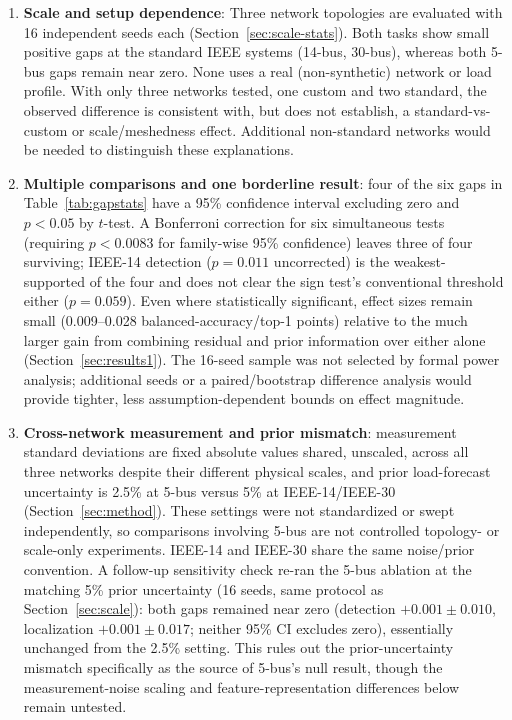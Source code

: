 \documentclass[conference]{IEEEtran}
\begin{document}
\begin{enumerate}
\item \textbf{Scale and setup dependence}: Three network topologies are evaluated with 16 independent seeds each (Section~\ref{sec:scale-stats}). Both tasks show small positive gaps at the standard IEEE systems (14-bus, 30-bus), whereas both 5-bus gaps remain near zero. None uses a real (non-synthetic) network or load profile. With only three networks tested, one custom and two standard, the observed difference is consistent with, but does not establish, a standard-vs-custom or scale/meshedness effect. Additional non-standard networks would be needed to distinguish these explanations.
\item \textbf{Multiple comparisons and one borderline result}: four of the six gaps in Table~\ref{tab:gapstats} have a 95\% confidence interval excluding zero and $p<0.05$ by $t$-test. A Bonferroni correction for six simultaneous tests (requiring $p<0.0083$ for family-wise 95\% confidence) leaves three of four surviving; IEEE-14 detection ($p=0.011$ uncorrected) is the weakest-supported of the four and does not clear the sign test's conventional threshold either ($p=0.059$). Even where statistically significant, effect sizes remain small (0.009--0.028 balanced-accuracy/top-1 points) relative to the much larger gain from combining residual and prior information over either alone (Section~\ref{sec:results1}). The 16-seed sample was not selected by formal power analysis; additional seeds or a paired/bootstrap difference analysis would provide tighter, less assumption-dependent bounds on effect magnitude.
\item \textbf{Cross-network measurement and prior mismatch}: measurement standard deviations are fixed absolute values shared, unscaled, across all three networks despite their different physical scales, and prior load-forecast uncertainty is 2.5\% at 5-bus versus 5\% at IEEE-14/IEEE-30 (Section~\ref{sec:method}). These settings were not standardized or swept independently, so comparisons involving 5-bus are not controlled topology- or scale-only experiments. IEEE-14 and IEEE-30 share the same noise/prior convention. A follow-up sensitivity check re-ran the 5-bus ablation at the matching 5\% prior uncertainty (16 seeds, same protocol as Section~\ref{sec:scale}): both gaps remained near zero (detection $+0.001\pm0.010$, localization $+0.001\pm0.017$; neither 95\% CI excludes zero), essentially unchanged from the 2.5\% setting. This rules out the prior-uncertainty mismatch specifically as the source of 5-bus's null result, though the measurement-noise scaling and feature-representation differences below remain untested.

\end{enumerate}
\end{document}
